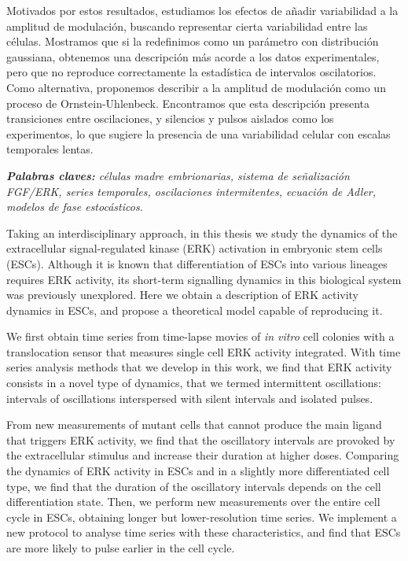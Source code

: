 \documentclass[./main.tex]{subfiles}
\begin{document}
Motivados por estos resultados, estudiamos los efectos de añadir variabilidad a la amplitud de modulación, buscando representar cierta variabilidad entre las células. Mostramos que si la redefinimos como un parámetro con distribución gaussiana, obtenemos una descripción más acorde a los datos experimentales, pero que no reproduce correctamente la estadística de intervalos oscilatorios. Como alternativa, proponemos describir a la amplitud de modulación como un proceso de Ornstein-Uhlenbeck. Encontramos que esta descripción presenta transiciones entre oscilaciones, y silencios y pulsos aislados como los experimentos, lo que sugiere la presencia de una variabilidad celular con escalas temporales lentas.
\vspace{0.5cm}

\textit{\textbf{Palabras claves:} células madre embrionarias, sistema de señalización FGF/ERK, series temporales, oscilaciones intermitentes, ecuación de Adler, modelos de fase estocásticos.}




Taking an interdisciplinary approach, in this thesis we study the dynamics of the extracellular signal-regulated kinase (ERK) activation in embryonic stem cells (ESCs). Although it is known that differentiation of ESCs into various lineages requires ERK activity, its short-term signalling dynamics in this biological system was previously unexplored. Here we obtain a description of ERK activity dynamics in ESCs, and propose a theoretical model capable of reproducing it.

We first obtain time series from time-lapse movies of \textit{in vitro} cell colonies with a translocation sensor that measures single cell ERK activity integrated. With time series analysis methods that we develop in this work, we find that ERK activity consists in a novel type of dynamics, that we termed intermittent oscillations: intervals of oscillations interspersed with silent intervals and isolated pulses.

From new measurements of mutant cells that cannot produce the main ligand that triggers ERK activity, we find that the oscillatory intervals are provoked by the extracellular stimulus and increase their duration at higher doses. Comparing the dynamics of ERK activity in ESCs and in a slightly more differentiated cell type, we find that the duration of the oscillatory intervals depends on the cell differentiation state. Then, we perform new measurements over the entire cell cycle in ESCs, obtaining longer but lower-resolution time series. We implement a new protocol to analyse time series with these characteristics, and find that ESCs are more likely to pulse earlier in the cell cycle.
\end{document}
